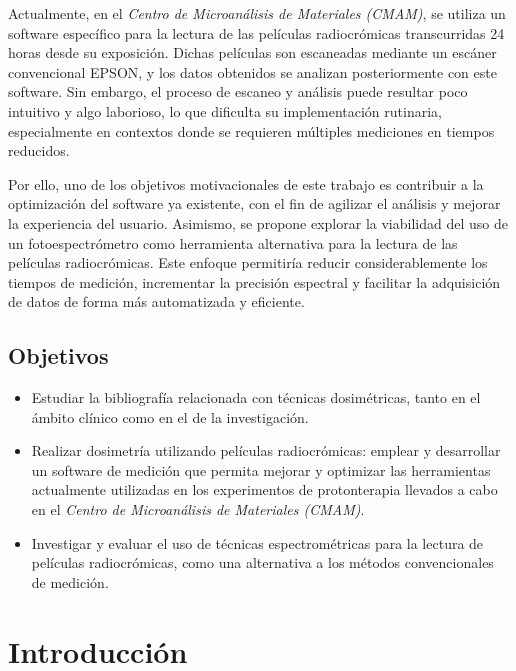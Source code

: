 \documentclass[onecolumn,12pt]{article} %
\begin{document}
Actualmente, en el \textit{Centro de Microanálisis de Materiales (CMAM)}, se utiliza un software específico para la lectura de las películas radiocrómicas transcurridas 24 horas desde su exposición. Dichas películas son escaneadas mediante un escáner convencional EPSON, y los datos obtenidos se analizan posteriormente con este software. Sin embargo, el proceso de escaneo y análisis puede resultar poco intuitivo y algo laborioso, lo que dificulta su implementación rutinaria, especialmente en contextos donde se requieren múltiples mediciones en tiempos reducidos.

Por ello, uno de los objetivos motivacionales de este trabajo es contribuir a la optimización del software ya existente, con el fin de agilizar el análisis y mejorar la experiencia del usuario. Asimismo, se propone explorar la viabilidad del uso de un fotoespectrómetro como herramienta alternativa para la lectura de las películas radiocrómicas. Este enfoque permitiría reducir considerablemente los tiempos de medición, incrementar la precisión espectral y facilitar la adquisición de datos de forma más automatizada y eficiente.




\subsection*{Objetivos}
\begin{itemize}
    \item Estudiar la bibliografía relacionada con técnicas dosimétricas, tanto en el ámbito clínico como en el de la investigación.

    \item Realizar dosimetría utilizando películas radiocrómicas: emplear y desarrollar un software de medición que permita mejorar y optimizar las herramientas actualmente utilizadas en los experimentos de protonterapia llevados a cabo en el \textit{Centro de Microanálisis de Materiales (CMAM)}.

    \item Investigar y evaluar el uso de técnicas espectrométricas para la lectura de películas radiocrómicas, como una alternativa a los métodos convencionales de medición.
\end{itemize}





\section{Introducción}
\end{document}
